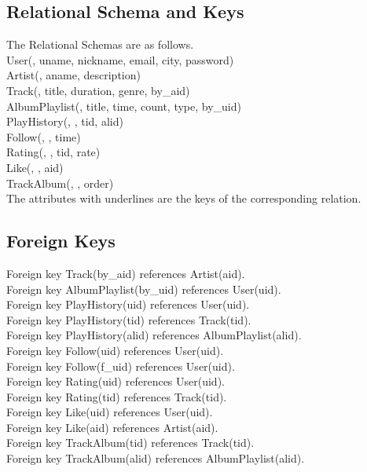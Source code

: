 \documentclass[letterpaper, 12pt]{report}
\begin{document}
	\subsection{Relational Schema and Keys}
	The Relational Schemas are as follows.\\
	User(\underline{}, uname, nickname, email, city, password)\\
	Artist(\underline{}, aname, description)\\
	Track(\underline{}, title, duration, genre, by\_aid)\\
	AlbumPlaylist(\underline{}, title, time, count, type, by\_uid)\\
	PlayHistory(\underline{}, \underline{}, tid, alid)\\
	Follow(\underline{}, \underline{}, time)\\
	Rating(\underline{}, \underline{}, tid, rate)\\
	Like(\underline{}, \underline{}, aid)\\
	TrackAlbum(\underline{}, \underline{}, order)\\
	The attributes with underlines are the keys of the corresponding relation.
	\subsection{Foreign Keys}
	Foreign key Track(by\_aid) references Artist(aid).\\
	Foreign key AlbumPlaylist(by\_uid) references User(uid).\\
	Foreign key PlayHistory(uid) references User(uid).\\
	Foreign key PlayHistory(tid) references Track(tid).\\
	Foreign key PlayHistory(alid) references AlbumPlaylist(alid).\\
	Foreign key Follow(uid) references User(uid).\\
	Foreign key Follow(f\_uid) references User(uid).\\
	Foreign key Rating(uid) references User(uid).\\
	Foreign key Rating(tid) references Track(tid).\\
	Foreign key Like(uid) references User(uid).\\
	Foreign key Like(aid) references Artist(aid).\\
	Foreign key TrackAlbum(tid) references Track(tid).\\
	Foreign key TrackAlbum(alid) references AlbumPlaylist(alid).\\
	
\end{document}
